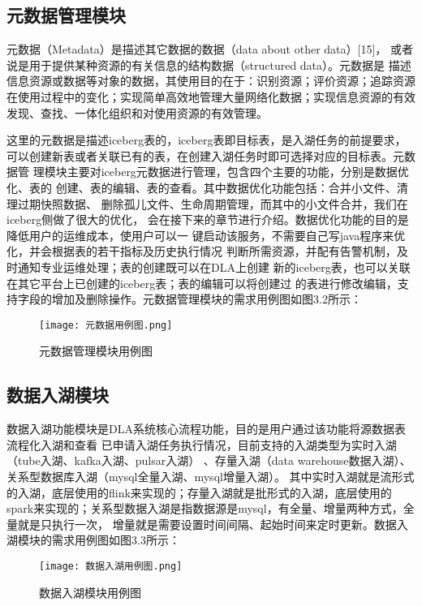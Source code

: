 \subsection{元数据管理模块}

元数据（Metadata）是描述其它数据的数据（data about other data）[15]，
或者说是用于提供某种资源的有关信息的结构数据（structured data）。元数据是
描述信息资源或数据等对象的数据，其使用目的在于：识别资源；评价资源；追踪资源
在使用过程中的变化；实现简单高效地管理大量网络化数据；实现信息资源的有效发现、查找、一体化组织和对使用资源的有效管理。

这里的元数据是描述iceberg表的，iceberg表即目标表，是入湖任务的前提要求，
可以创建新表或者关联已有的表，在创建入湖任务时即可选择对应的目标表。元数据管
理模块主要对iceberg元数据进行管理，包含四个主要的功能，分别是数据优化、表的
创建、表的编辑、表的查看。其中数据优化功能包括：合并小文件、清理过期快照数据、
删除孤儿文件、生命周期管理，而其中的小文件合并，我们在iceberg侧做了很大的优化，
会在接下来的章节进行介绍。数据优化功能的目的是降低用户的运维成本，使用户可以一
键启动该服务，不需要自己写java程序来优化，并会根据表的若干指标及历史执行情况
判断所需资源，并配有告警机制，及时通知专业运维处理；表的创建既可以在DLA上创建
新的iceberg表，也可以关联在其它平台上已创建的iceberg表；表的编辑可以将创建过
的表进行修改编辑，支持字段的增加及删除操作。元数据管理模块的需求用例图如图3.2所示：

\begin{figure}[h]
  \centering
  \texttt{[image: 元数据用例图.png]}
  \caption{元数据管理模块用例图}
  \label{fig:badge}
\end{figure}

\subsection{数据入湖模块}

数据入湖功能模块是DLA系统核心流程功能，目的是用户通过该功能将源数据表流程化入湖和查看
已申请入湖任务执行情况，目前支持的入湖类型为实时入湖（tube入湖、kafka入湖、pulsar入湖）
、存量入湖（data warehouse数据入湖）、关系型数据库入湖（mysql全量入湖、mysql增量入湖）。
其中实时入湖就是流形式的入湖，底层使用的flink来实现的；存量入湖就是批形式的入湖，底层使用的
spark来实现的；关系型数据入湖是指数据源是mysql，有全量、增量两种方式，全量就是只执行一次，
增量就是需要设置时间间隔、起始时间来定时更新。数据入湖模块的需求用例图如图3.3所示：

\begin{figure}[h]
  \centering
  \texttt{[image: 数据入湖用例图.png]}
  \caption{数据入湖模块用例图}
  \label{fig:badge}
\end{figure}

